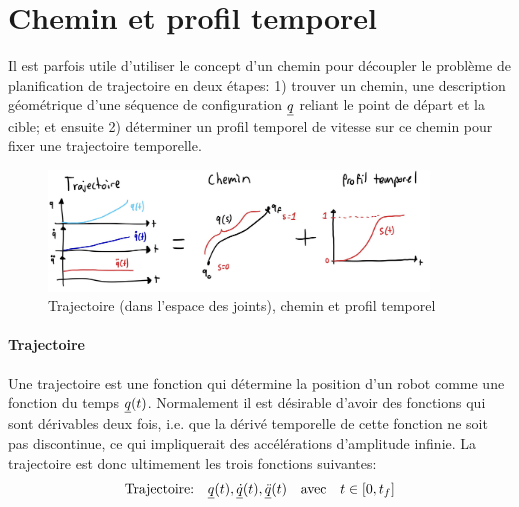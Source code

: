 


\section{Chemin et profil temporel}
\label{sec:chemin}



Il est parfois utile d'utiliser le concept d'un chemin pour découpler le problème de planification de trajectoire en deux étapes: 1) trouver un chemin, une description géométrique d'une séquence de configuration $\underline{q}$ reliant le point de départ et la cible; et ensuite 2) déterminer un profil temporel de vitesse sur ce chemin pour fixer une trajectoire temporelle.


\begin{figure}[htbp]
	\centering
		\includegraphics[width=0.90\textwidth]{fig/traj_path.jpg}
	\caption{Trajectoire (dans l'espace des joints), chemin et profil temporel}
	\label{fig:traj_path}
\end{figure}

\paragraph{Trajectoire} Une trajectoire est une fonction qui détermine la position d'un robot comme une fonction du temps $\underline{q}(t)$. Normalement il est désirable d'avoir des fonctions qui sont dérivables deux fois, i.e. que la dérivé temporelle de cette fonction ne soit pas discontinue, ce qui impliquerait des accélérations d'amplitude infinie. La trajectoire est donc ultimement les trois fonctions suivantes:
\begin{align}
    \text{Trajectoire:} \quad \underline{q}(t), \underline{\dot{q}}(t), \underline{\ddot{q}}(t) \quad \text{avec} \quad t \in [0,t_f]
\end{align}

